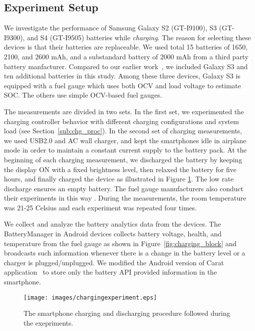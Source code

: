 \documentclass[journal]{IEEEtran}
\begin{document}
\subsection{Experiment Setup}
We investigate the performance of Samsung Galaxy S2 (GT-I9100), S3 (GT-I9300), and S4 (GT-I9505) batteries while \textit{charging}. The reason for selecting these devices is that their batteries are replaceable. We used total 15 batteries of 1650, 2100, and 2600 mAh, and a substandard battery of 2000 mAh from a third party battery manfacturer. Compared to our earlier work~\cite{mhotpower2015}, we included Galaxy S3 and ten additional batteries in this study.  Among these three devices, Galaxy S3 is equipped with a fuel gauge which uses both OCV and load voltage to estimate SOC. The others use simple OCV-based fuel gauges.


 

The measurements  are divided in two sets. In the first  set, we experimented the charging controller behavior with different charging configurations and system load (see Section~\ref{sub:chg_proc}). In the  second set of  charging measurements, we used USB2.0 and AC wall charger, and kept the smartphones idle in airplane mode in order to maintain a constant current supply to the battery pack. At the beginning of each charging measurement, we discharged the battery by keeping the display ON with a fixed brightness level, then relaxed the battery for five hours, and finally charged the device as illustrated in Figure \ref{fig:chargingexperiment}. The low rate discharge ensures an empty battery. The fuel gauge manufacturers also conduct their experiments in this way \cite{impedence}. During the measurements, the room temperature was 21-25 Celsius and each experiment was repeated four times. 




We collect and analyze the battery analytics data from the devices. The BatteryManager in Android devices collects battery voltage, health, and temperature from the fuel gauge as shown in Figure~\ref{fig:charging_block} and broadcasts such information whenever there is a change in the battery level or a charger is plugged/unplugged. We modified the Android version of Carat application~\cite{Oliner2013} to store only the battery API provided information in the smartphone. 



\begin{figure}[t]
  \begin{center}
   \texttt{[image: images/chargingexperiment.eps]}
    \caption{The smartphone charging and discharging  procedure followed during the exepriments.}
    \label{fig:chargingexperiment}
 \end{center}
 \end{figure}
\end{document}
